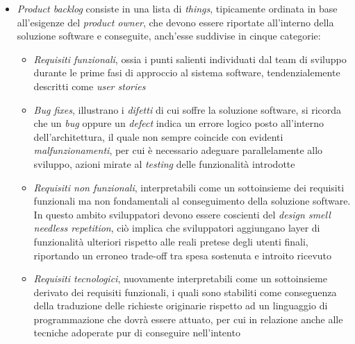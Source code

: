 \documentclass{article}
\begin{document}
\begin{itemize}[label={-}]
    \itemsep0em
    \item \textit{Product backlog} consiste in una lista di \textit{things}, tipicamente ordinata in base all'esigenze del \textit{product owner}, che devono essere riportate all'interno della soluzione software e conseguite, anch'esse suddivise in cinque categorie: \begin{itemize}[label={-}]
                                                                                                                                                                                                                                                                                \item \textit{Requisiti funzionali}, ossia i punti salienti individuati dal team di sviluppo durante le prime fasi di approccio al sistema software, tendenzialemente descritti come \textit{user stories}
                                                                                                                                                                                                                                                                                \item \textit{Bug fixes}, illustrano i \textit{difetti} di cui soffre la soluzione software, si ricorda che un \textit{bug} oppure un \textit{defect} indica un errore logico posto all'interno dell'architettura, il quale non sempre coincide con evidenti \textit{malfunzionamenti}, per cui è necessario adeguare parallelamente allo sviluppo, azioni mirate al \textit{testing} delle funzionalità introdotte
                                                                                                                                                                                                                                                                                \item \textit{Requisiti non funzionali}, interpretabili come un sottoinsieme dei requisiti funzionali ma non fondamentali al conseguimento della soluzione software. In questo ambito sviluppatori devono essere coscienti del \textit{design smell} \textit{needless repetition}, ciò implica che sviluppatori aggiungano layer di funzionalità ulteriori rispetto alle reali pretese degli utenti finali, riportando un erroneo trade-off tra spesa sostenuta e introito ricevuto
                                                                                                                                                                                                                                                                                \item \textit{Requisiti tecnologici}, nuovamente interpretabili come un sottoinsieme derivato dei requisiti funzionali, i quali sono stabiliti come conseguenza della traduzione delle richieste originarie rispetto ad un linguaggio di programmazione che dovrà essere attuato, per cui in relazione anche alle tecniche adoperate pur di conseguire nell'intento

\end{itemize}
\end{itemize}
\end{document}
